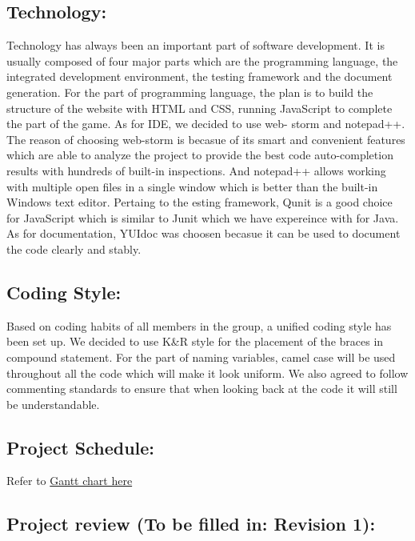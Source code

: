 \documentclass{article}
\begin{document}
\subsection*{Technology:} 
Technology has always been an important part of
software development. It is usually composed of four major parts which are the
programming language, the integrated development environment, the testing
framework and the document generation. For the part of programming language, the
plan is to build the structure of the website with HTML and CSS, running
JavaScript to complete the part of the game. As for IDE, we decided to use web-
storm and notepad++. The reason of choosing web-storm is becasue of its smart
and convenient features which are able to analyze the project to provide the
best code auto-completion results with hundreds of built-in inspections. And
notepad++ allows working with multiple open files in a single window which is
better than the built-in  Windows text editor. Pertaing to the esting framework,
Qunit is a good choice for JavaScript which is similar to Junit which we have
expereince with for Java. As for documentation, YUIdoc was choosen becasue it
can be used to document the code clearly and stably.

\subsection*{Coding Style:} 
Based on coding habits of all members in the group,
a unified coding style has been set up. We decided to use K\&R style for the
placement of the braces in compound statement. For the part of naming variables,
camel case will be used throughout all the code which will make it look uniform.
We also agreed to follow commenting standards to ensure that when looking back
at the code it will still be understandable.

\subsection*{Project Schedule:} Refer to  \href{https://gitlab.cas.mcmaster.ca/p
athmap/JSTanks/tree/master/ProjectSchedule}{Gantt chart here}

\subsection*{Project review (To be filled in: Revision 1):}
\end{document}
